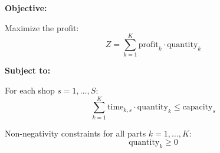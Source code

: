 \documentclass{article}
\begin{document}
\textbf{Objective:}

Maximize the profit: 
\[
Z = \sum_{k=1}^{K} \text{profit}_k \cdot \text{quantity}_k
\]

\textbf{Subject to:}

For each shop \( s = 1, \ldots, S \):
\[
\sum_{k=1}^{K} \text{time}_{k,s} \cdot \text{quantity}_k \leq \text{capacity}_s
\]

Non-negativity constraints for all parts \( k = 1, \ldots, K \):
\[
\text{quantity}_k \geq 0
\]
\end{document}
